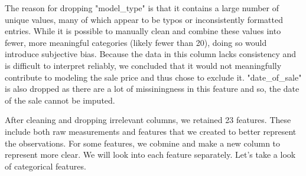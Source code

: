 \documentclass[12pt]{article}
\begin{document}
The reason for dropping "model\_type" is that it contains a large number of unique values, many of which appear to be typos or inconsistently formatted entries. While it is possible to manually clean and combine these values into fewer, more meaningful categories (likely fewer than 20), doing so would introduce subjective bias. Because the data in this column lacks consistency and is difficult to interpret reliably, we concluded that it would not meaningfully contribute to modeling the sale price and thus chose to exclude it. "date\_of\_sale" is also dropped as there are a lot of missiningness in this feature and so, the date of the sale cannot be imputed.

After cleaning and dropping irrelevant columns, we retained 23 features. These include both raw measurements and features that we created to better represent the observations. For some features, we cobmine and make a new column to represent more clear. We will look into each feature separately. Let's take a look of categorical features.
\end{document}
